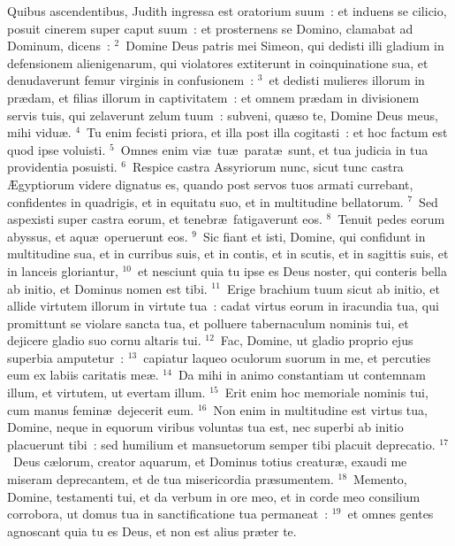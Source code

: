 \bchapter
\lettrine[lines=3,image=true,loversize=0.05,lraise=-0.03]{Q}{}uibus ascendentibus, Judith ingressa est oratorium suum~: et induens se cilicio, posuit cinerem super caput suum~: et prosternens se Domino, clamabat ad Dominum, dicens~:
${}^{2}$~Domine Deus patris mei Simeon, qui dedisti illi gladium in defensionem alienigenarum, qui violatores extiterunt in coinquinatione sua, et denudaverunt femur virginis in confusionem~:
${}^{3}$~et dedisti mulieres illorum in pr\ae dam, et filias illorum in captivitatem~: et omnem pr\ae dam in divisionem servis tuis, qui zelaverunt zelum tuum~: subveni, qu\ae so te, Domine Deus meus, mihi vidu\ae .
${}^{4}$~Tu enim fecisti priora, et illa post illa cogitasti~: et hoc factum est quod ipse voluisti.
${}^{5}$~Omnes enim vi\ae\ tu\ae\ parat\ae\ sunt, et tua judicia in tua providentia posuisti.
${}^{6}$~Respice castra Assyriorum nunc, sicut tunc castra \AE gyptiorum videre dignatus es, quando post servos tuos armati currebant, confidentes in quadrigis, et in equitatu suo, et in multitudine bellatorum.
${}^{7}$~Sed aspexisti super castra eorum, et tenebr\ae\ fatigaverunt eos.
${}^{8}$~Tenuit pedes eorum abyssus, et aqu\ae\ operuerunt eos.
${}^{9}$~Sic fiant et isti, Domine, qui confidunt in multitudine sua, et in curribus suis, et in contis, et in scutis, et in sagittis suis, et in lanceis gloriantur,
${}^{10}$~et nesciunt quia tu ipse es Deus noster, qui conteris bella ab initio, et Dominus nomen est tibi.
${}^{11}$~Erige brachium tuum sicut ab initio, et allide virtutem illorum in virtute tua~: cadat virtus eorum in iracundia tua, qui promittunt se violare sancta tua, et polluere tabernaculum nominis tui, et dejicere gladio suo cornu altaris tui.
${}^{12}$~Fac, Domine, ut gladio proprio ejus superbia amputetur~:
${}^{13}$~capiatur laqueo oculorum suorum in me, et percuties eum ex labiis caritatis me\ae .
${}^{14}$~Da mihi in animo constantiam ut contemnam illum, et virtutem, ut evertam illum.
${}^{15}$~Erit enim hoc memoriale nominis tui, cum manus femin\ae\ dejecerit eum.
${}^{16}$~Non enim in multitudine est virtus tua, Domine, neque in equorum viribus voluntas tua est, nec superbi ab initio placuerunt tibi~: sed humilium et mansuetorum semper tibi placuit deprecatio.
${}^{17}$~Deus c\ae lorum, creator aquarum, et Dominus totius creatur\ae , exaudi me miseram deprecantem, et de tua misericordia pr\ae sumentem.
${}^{18}$~Memento, Domine, testamenti tui, et da verbum in ore meo, et in corde meo consilium corrobora, ut domus tua in sanctificatione tua permaneat~:
${}^{19}$~et omnes gentes agnoscant quia tu es Deus, et non est alius pr\ae ter te.

